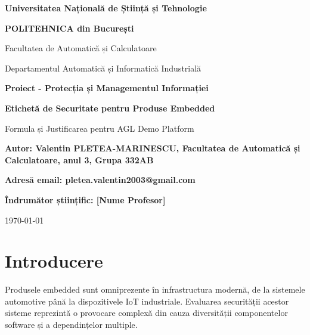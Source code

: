 \documentclass[12pt,a4paper]{article}
\begin{document}
\begin{titlepage}
    \centering
    \vspace{1cm}
    
    {\Large\bfseries\centering Universitatea Națională de Știință și Tehnologie}
    
    {\large\bfseries\centering POLITEHNICA din București}
    
    {\large\centering Facultatea de Automatică și Calculatoare}
    
    {\large\centering Departamentul Automatică și Informatică Industrială}
    
    \vspace{3cm}
    
    {\Large\bfseries\centering Proiect - Protecția și Managementul Informației}

    \vspace{2cm}
    
    {\LARGE\bfseries\centering Etichetă de Securitate pentru Produse Embedded\\[1cm]}
    
    {\large\centering Formula și Justificarea pentru AGL Demo Platform}

    \vspace{\fill}
    
    \raggedright
    {\large\bfseries Autor: Valentin PLETEA-MARINESCU, Facultatea de Automatică și
    Calculatoare, anul 3, Grupa 332AB \par}
    {\large\bfseries Adresă email: pletea.valentin2003@gmail.com \par}
    {\large\bfseries Îndrumător științific: [Nume Profesor]\par}
    
    \vspace{1cm}
    
    {\large\centering \today}
\end{titlepage}

\hypersetup{linkcolor=black}
\tableofcontents
\newpage

\section{Introducere}

Produsele embedded sunt omniprezente în infrastructura modernă, de la sistemele automotive până la dispozitivele IoT industriale. Evaluarea securității acestor sisteme reprezintă o provocare complexă din cauza diversității componentelor software și a dependințelor multiple.
\end{document}

